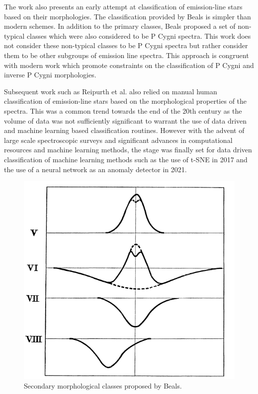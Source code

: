 The work also presents an early attempt at classification of emission-line stars based on their morphologies. The classification provided by Beals is simpler than modern schemes\cite{reipurth1996halpha}. In addition to the primary classes, Beals proposed a set of non-typical classes which were also considered to be P Cygni spectra. This work does not consider these non-typical classes to be P Cygni spectra but rather consider them to be other subgroups of emission line spectra. This approach is congruent with modern work\cite{vcotar2021galah}\cite{zhang2021catalog}\cite{reipurth1996halpha} which promote constraints on the classification of P Cygni and inverse P Cygni morphologies. 

Subsequent work such as Reipurth et al.\cite{reipurth1996halpha} also relied on manual human classification of emission-line stars based on the morphological properties of the spectra. This was a common trend towards the end of the 20th century as the volume of data was not sufficiently significant to warrant the use of data driven and machine learning based classification routines. However with the advent of large scale spectroscopic surveys and significant advances in computational resources and machine learning methods, the stage was finally set for data driven classification of machine learning methods such as the use of t-SNE in 2017\cite{traven2017galah} and the use of a neural network as an anomaly detector in 2021\cite{vcotar2021galah}.

\begin{figure}[!htb]
\centering
\includegraphics[scale=.50]{figures/beals class 2.png}
\caption{Secondary morphological classes proposed by Beals.}
\end{figure}

